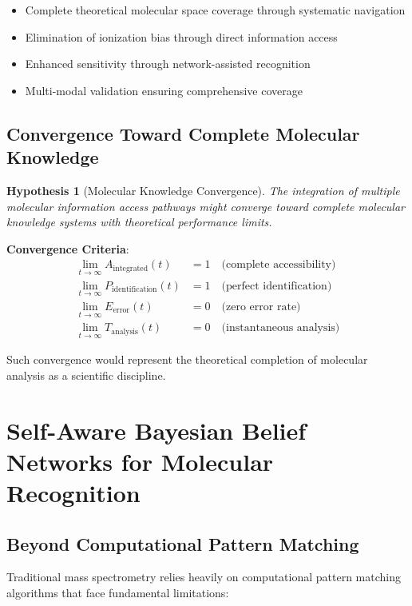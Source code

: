 \documentclass[11pt,a4paper]{article}
\newtheorem{hypothesis}[theorem]{Hypothesis}
\theoremstyle{remark}
\begin{document}
\begin{itemize}
\item Complete theoretical molecular space coverage through systematic navigation
\item Elimination of ionization bias through direct information access
\item Enhanced sensitivity through network-assisted recognition
\item Multi-modal validation ensuring comprehensive coverage
\end{itemize}

\subsection{Convergence Toward Complete Molecular Knowledge}

\begin{hypothesis}[Molecular Knowledge Convergence]
The integration of multiple molecular information access pathways might converge toward complete molecular knowledge systems with theoretical performance limits.
\end{hypothesis}

\textbf{Convergence Criteria}:
\begin{align}
\lim_{t \to \infty} A_{\text{integrated}}(t) &= 1 \quad \text{(complete accessibility)}\\
\lim_{t \to \infty} P_{\text{identification}}(t) &= 1 \quad \text{(perfect identification)}\\
\lim_{t \to \infty} E_{\text{error}}(t) &= 0 \quad \text{(zero error rate)}\\
\lim_{t \to \infty} T_{\text{analysis}}(t) &= 0 \quad \text{(instantaneous analysis)}
\end{align}

Such convergence would represent the theoretical completion of molecular analysis as a scientific discipline.

\section{Self-Aware Bayesian Belief Networks for Molecular Recognition}

\subsection{Beyond Computational Pattern Matching}

Traditional mass spectrometry relies heavily on computational pattern matching algorithms that face fundamental limitations:
\end{document}
